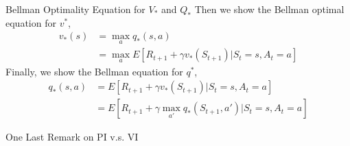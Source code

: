\documentclass{beamer}
\begin{document}
\begin{frame}{Bellman Optimality Equation for $V_*$ and $Q_*$}
    Then we show the Bellman optimal equation for $v^*$,
    \[
    \begin{split}
        v_*(s) &= \max_a q_*(s,a) \\
        & = \max_a E[R_{t+1} + \gamma v_*(S_{t+1})|S_t=s, A_t=a]
    \end{split}
    \]
    Finally, we show the Bellman equation for $q^*$,
    \[
    \begin{split}
        q_*(s,a) 
        &= E[R_{t+1} + \gamma v_*(S_{t+1})|S_t=s, A_t=a] \\
        &= E[R_{t+1} + \gamma \max_{a'}q_*(S_{t+1}, a') |S_t=s, A_t=a]
    \end{split}
\]
\end{frame}


\begin{frame}{One Last Remark on PI v.s. VI}

\end{frame}



    






\end{document}
